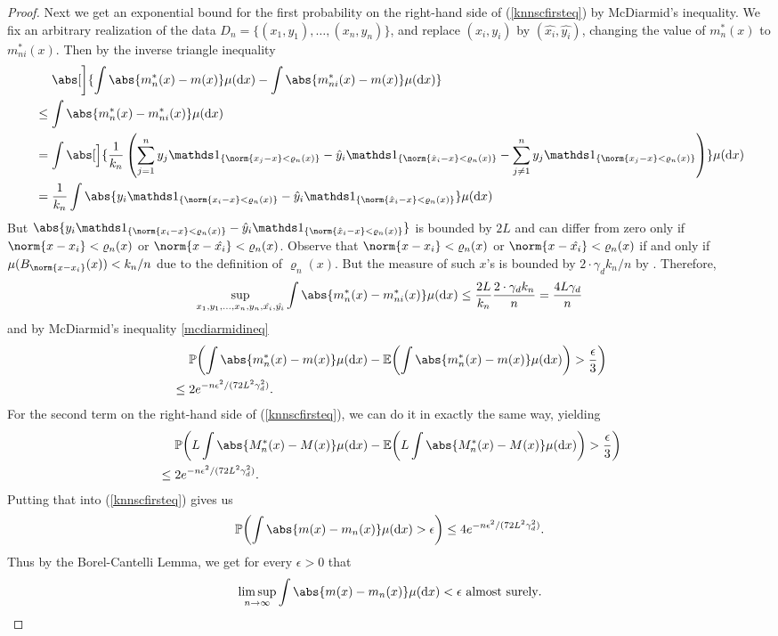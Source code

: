\begin{proof}
    Next we get an exponential bound for the first probability on the right-hand
    side of (\ref{knnscfirsteq}) by McDiarmid's inequality. We fix an arbitrary realization of the data \(D_n = \{(x_1, y_1), \ldots, (x_n, y_n)\}\), and replace \((x_i, y_i)\) by \((\hat{x_i}, \hat{y_i})\), changing the value of \(m_n^*(x)\) to \(m_{ni}^*(x)\). Then by the inverse triangle inequality
    \begin{align*}
        &\quad \ \abs[\bigg]{\int \abs{m_n^*(x) - m(x)} \mu(\dx) - \int \abs{m_{ni}^*(x) - m(x)} \mu(\dx)} \\
        &\leq \int \abs{m_n^*(x) - m_{ni}^*(x)} \mu(\dx) \\
        &= \int \abs[\Big]{\frac{1}{k_n}\left(\sum_{j = 1}^n y_j \ind{\{\norm{x_j - x} < \varrho_n(x)\}} - \hat{y}_i \ind{\{\norm{\hat{x}_i - x} < \varrho_n(x)\}} - \sum_{j \neq 1}^n y_j \ind{\{\norm{x_j - x} < \varrho_n(x)\}}\right)} \mu(\dx) \\
        &= \frac{1}{k_n} \int \abs{y_i \ind{\{\norm{x_i - x} < \varrho_n(x)\}} - \hat{y}_i \ind{\{\norm{\hat{x}_i - x} < \varrho_n(x)\}}} \mu(\dx)
    \end{align*}
    But \(\abs{y_i \ind{\{\norm{x_i - x} < \varrho_n(x)\}} - \hat{y}_i \ind{\{\norm{\hat{x}_i - x} < \varrho_n(x)\}}}\) is bounded by \(2L\) and can differ from zero only if \(\norm{x - x_i} < \varrho_n(x)\) or \(\norm{x - \hat{x_i}} < \varrho_n(x)\). Observe that \(\norm{x - x_i} < \varrho_n(x)\) or \(\norm{x - \hat{x_i}} < \varrho_n(x)\) if and only if \(\mu(B_{\norm{x - x_i}}(x)) < k_n / n\) due to the definition of \(\varrho_n(x)\). But the measure of such \(x\)'s is bounded by \(2 \cdot \gamma_d k_n / n\) by .
    Therefore,
    \[
        \sup_{x_1, y_1, \ldots, x_n, y_n, \hat{x_i}, \hat{y_i}}
        \int \abs{m_{n}^*(x) - m_{ni}^*(x)} \mu(\dx)
        \leq \frac{2L}{k_n} \frac{2 \cdot \gamma_d k_n}{n} = \frac{4L \gamma_d}{n}
    \]
    and by McDiarmid's inequality \ref{mcdiarmidineq}
    \begin{align*}
        &\quad \ \pro{\int \abs{m_n^*(x) - m(x)} \mu(\dx) - \ev{\int \abs{m_n^*(x) - m(x)} \mu(\dx)}  > \frac{\epsilon}{3}} \\
        &\leq 2e^{-n\epsilon^2 / (72L^2 \gamma_d^2)}.
    \end{align*}
    For the second term on the right-hand side of (\ref{knnscfirsteq}), we can do it in exactly the same way, yielding
    \begin{align*}
        &\quad \ \pro{L\int \abs{M_n^*(x) - M(x)} \mu(\dx) - \ev{L\int \abs{M_n^*(x) - M(x)} \mu(\dx)}  > \frac{\epsilon}{3}} \\
        &\leq 2e^{-n\epsilon^2 / (72L^2 \gamma_d^2)}.
    \end{align*}
    Putting that into (\ref{knnscfirsteq}) gives us
    \[
        \pro{\int \abs{m(x) - m_n(x)} \mu(\dx) > \epsilon}
        \leq 4e^{-n\epsilon^2 / (72 L^2 \gamma^2_d)}.
    \]
    Thus by the Borel-Cantelli Lemma, we get for every \(\epsilon > 0\) that
    \[
        \limsup_{n \to \infty} \int \abs{m(x) - m_n(x)} \mu(\dx) < \epsilon \ \text{almost surely}.
    \]
   

\end{proof}
